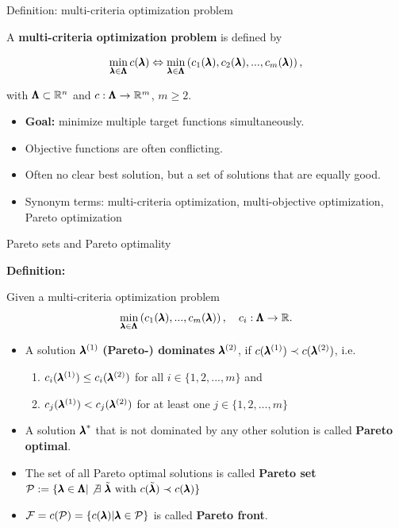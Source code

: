 \begin{frame}{Definition: multi-criteria optimization problem}

 A \textbf{multi-criteria optimization problem} is defined by

$$
\min_{\pmb{\lambda} \in \pmb{\Lambda}}  c(\pmb{\lambda}) \Leftrightarrow \min_{\pmb{\lambda} \in \pmb{\Lambda}} \left(c_1(\pmb{\lambda}), c_2(\pmb{\lambda}), ..., c_m(\pmb{\lambda})\right),
$$

with $\pmb{\Lambda} \subset \mathbb{R}^n$ and $c: \pmb{\Lambda} \to \mathbb{R}^m$, $m \ge 2$.

\begin{itemize}
\item \textbf{Goal:} minimize multiple target functions simultaneously.
\item Objective functions are often conflicting.
\item Often no clear best solution, but a set of solutions that are equally good.
\item Synonym terms: multi-criteria optimization, multi-objective optimization, Pareto optimization
\end{itemize}

\end{frame}

\begin{frame}{Pareto sets and Pareto optimality}

\textbf{Definition:}

Given a multi-criteria optimization problem
    $$\min_{\pmb{\lambda} \in \pmb{\Lambda}} \left(c_1(\pmb{\lambda}), ..., c_m(\pmb{\lambda})\right), \quad c_i: \pmb{\Lambda} \to \mathbb{R}.$$

\begin{itemize}
    \item A solution $\pmb{\lambda}^{(1)}$ \textbf{(Pareto-) dominates} $\pmb{\lambda}^{(2)}$, if $c(\pmb{\lambda}^{(1)}) \prec c(\pmb{\lambda}^{(2)})$, i.e.
\begin{enumerate}
    \item $c_i(\pmb{\lambda}^{(1)}) \le c_i(\pmb{\lambda}^{(2)})$ for all $i \in \{1, 2, ..., m\}$ and
    \item $c_j(\pmb{\lambda}^{(1)}) < c_j(\pmb{\lambda}^{(2)})$ for at least one $j \in \{1, 2, ..., m\}$
\end{enumerate}
\vspace*{0.1cm}
\item A solution ${\pmb{\lambda}}^*$ that is not dominated by any other solution is called \textbf{Pareto optimal}.
\vspace*{0.1cm}
\item The set of all Pareto optimal solutions is called \textbf{Pareto set} $\mathcal{P} := \{\pmb{\lambda} \in \pmb{\Lambda} |\not \exists ~\tilde{\pmb{\lambda}} \text{ with } c(\tilde{\pmb{\lambda}}) \prec c(\pmb{\lambda})\}$
\item $\mathcal{F} = c(\mathcal{P}) = \{c(\pmb{\lambda}) | \pmb{\lambda} \in \mathcal{P}\}$ is called \textbf{Pareto front}.
\end{itemize}

\end{frame}


